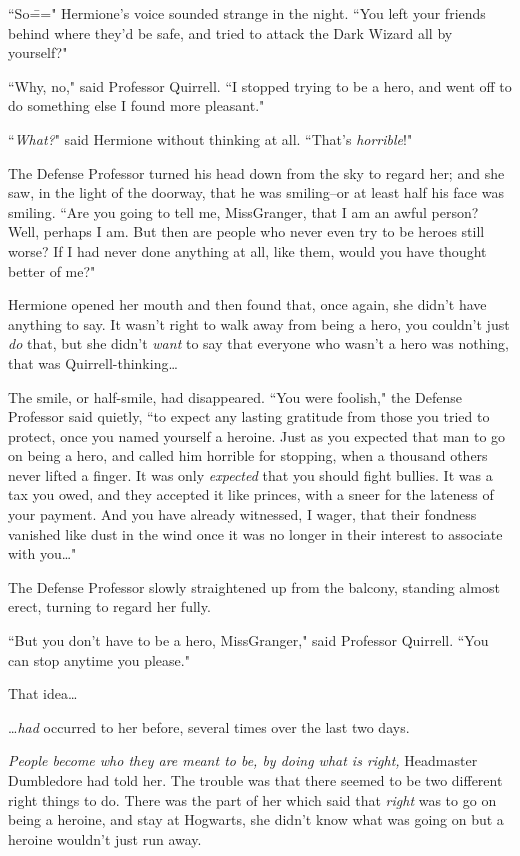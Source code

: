 ``So\===" Hermione's voice sounded strange in the night. ``You left your friends behind where they'd be safe, and tried to attack the Dark Wizard all by yourself?"

``Why, no," said Professor Quirrell. ``I stopped trying to be a hero, and went off to do something else I found more pleasant."

``\emph{What?}" said Hermione without thinking at all. ``That's \emph{horrible}!"

The Defense Professor turned his head down from the sky to regard her; and she saw, in the light of the doorway, that he was smiling\---or at least half his face was smiling. ``Are you going to tell me, Miss\?Granger, that I am an awful person? Well, perhaps I am. But then are people who never even try to be heroes still worse? If I had never done anything at all, like them, would you have thought better of me?"

Hermione opened her mouth and then found that, once again, she didn't have anything to say. It wasn't right to walk away from being a hero, you couldn't just \emph{do} that, but she didn't \emph{want} to say that everyone who wasn't a hero was nothing, that was Quirrell-thinking{\ldots}

The smile, or half-smile, had disappeared. ``You were foolish," the Defense Professor said quietly, ``to expect any lasting gratitude from those you tried to protect, once you named yourself a heroine. Just as you expected that man to go on being a hero, and called him horrible for stopping, when a thousand others never lifted a finger. It was only \emph{expected} that you should fight bullies. It was a tax you owed, and they accepted it like princes, with a sneer for the lateness of your payment. And you have already witnessed, I wager, that their fondness vanished like dust in the wind once it was no longer in their interest to associate with you{\ldots}"

The Defense Professor slowly straightened up from the balcony, standing almost erect, turning to regard her fully.

``But you don't have to be a hero, Miss\?Granger," said Professor Quirrell. ``You can stop anytime you please."

That idea{\ldots}

{\ldots}\emph{had} occurred to her before, several times over the last two days.

\emph{People become who they are meant to be, by doing what is right,} Headmaster Dumbledore had told her. The trouble was that there seemed to be two different right things to do. There was the part of her which said that \emph{right} was to go on being a heroine, and stay at Hogwarts, she didn't know what was going on but a heroine wouldn't just run away.

